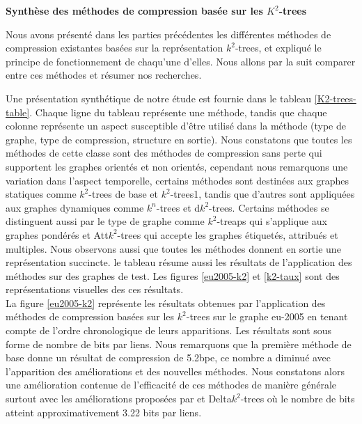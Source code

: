 
\textbf{Synthèse des méthodes de compression basée sur les $K^2$-trees }

Nous avons présenté dans les parties précédentes les différentes méthodes de compression existantes basées sur la représentation $k^2$-trees, et expliqué le principe de fonctionnement de chaqu'une d'elles. Nous allons par la suit comparer entre ces méthodes et résumer nos recherches.

Une présentation synthétique de notre étude est fournie dans le tableau \ref{K2-trees-table}. Chaque ligne du tableau représente une méthode, tandis que chaque colonne
représente un aspect susceptible d’être utilisé dans la méthode (type de graphe, type de compression, structure en sortie). Nous constatons que toutes les méthodes de cette classe sont des méthodes de compression sans perte qui supportent les graphes orientés et non orientés, cependant nous remarquons une variation dans l'aspect temporelle, certains méthodes sont destinées aux graphes statiques comme $k^2$-trees de base et $k^2$-trees1, tandis que d'autres sont appliquées aux graphes dynamiques comme $k^n$-trees et d$k^2$-trees. Certains méthodes se distinguent aussi par le type de graphe comme $k^2$-treaps qui s'applique aux graphes pondérés et Att$k^2$-trees qui accepte les graphes étiquetés, attribués et multiples. Nous observons aussi que toutes les méthodes donnent en sortie une représentation succincte. le tableau résume aussi les résultats de l'application des méthodes sur des graphes de test. Les figures \ref{eu2005-k2} et \ref{k2-taux} sont des représentations visuelles des ces résultats.\\

La figure \ref{eu2005-k2} représente les résultats obtenues par l'application des méthodes de compression basées sur les $k^2$-trees sur le graphe eu-2005 en tenant compte de l’ordre chronologique de leurs apparitions. Les résultats sont sous forme de nombre de bits par liens. Nous remarquons que la première méthode de base donne un résultat de compression de 5.2bpe, ce nombre a diminué avec l'apparition des améliorations et des nouvelles méthodes. Nous constatons alors une amélioration contenue de l'efficacité de ces méthodes de manière générale surtout avec les améliorations proposées par \citep{brisaboa2014compact} et Delta$k^2$-trees où le nombre de bits atteint approximativement 3.22 bits par liens.

